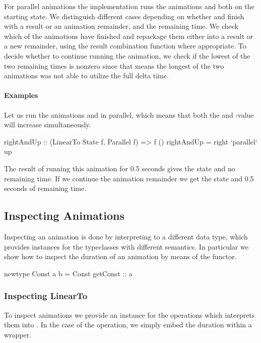 For parallel animations the  implementation runs
the animations  and  both on the starting
state. We distinguish different cases depending on whether  and
 finish with a result or an animation remainder, and the remaining
time. We check which of the animations have finished and repackage them
either into a result or a new remainder, using the result combination function
where appropriate. To decide whether to continue running the animation, we
check if the lowest of the two remaining times is nonzero since that means the
longest of the two animations was not able to utilize the full delta time.

\paragraph{Examples}

Let us run the animations  and  in parallel, which means
that both the  and -value will increase simultaneously.

\begin{code}
rightAndUp :: (LinearTo State f, Parallel f) => f ()
rightAndUp = right `parallel` up
\end{code}

The result of running this animation for 0.5 seconds gives the state  and no remaining time. If we continue the animation
remainder we get the state  and 0.5 seconds of remaining 
time.

\subsection{Inspecting Animations}

Inspecting an animation is done by interpreting \dsl{} to a different data
type, which provides instances for the typeclasses with different semantics.
In particular we show how to inspect the duration of an animation
by means of the  functor.

\begin{spec}
newtype Const a b = Const { getConst :: a }
\end{spec}

\subsubsection{Inspecting LinearTo}

To inspect animations we provide an instance for the operations which
interprets them into . In the case of the 
operation, we simply embed the duration within a  wrapper.

